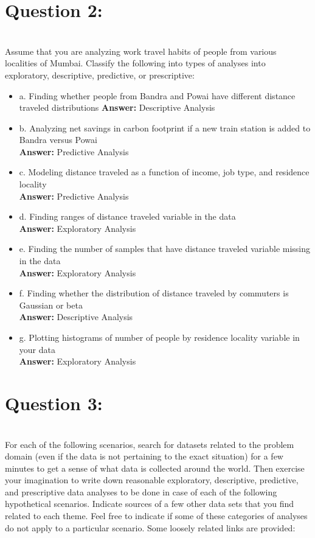 \documentclass[12pt]{article}
\begin{document}
\section*{Question 2:}\\
Assume that you are analyzing work travel habits of people from various localities of Mumbai. Classify the
following into types of analyses into exploratory, descriptive, predictive, or prescriptive: \\
\begin{itemize}
    \item a. Finding whether people from Bandra and Powai have different distance traveled distributions
    \textbf{Answer:} Descriptive Analysis
    \item b. Analyzing net savings in carbon footprint if a new train station is added to Bandra versus Powai\\
    \textbf{Answer:} Predictive Analysis
    \item c. Modeling distance traveled as a function of income, job type, and residence locality\\
    \textbf{Answer:} Predictive Analysis
    \item d. Finding ranges of distance traveled variable in the data\\ 
    \textbf{Answer:} Exploratory Analysis
    \item e. Finding the number of samples that have distance traveled variable missing in the data \\
    \textbf{Answer:} Exploratory Analysis
    \item f. Finding whether the distribution of distance traveled by commuters is Gaussian or beta \\
    \textbf{Answer:} Descriptive Analysis
    \item g. Plotting histograms of number of people by residence locality variable in your data \\
    \textbf{Answer:} Exploratory Analysis
\end{itemize}

\section*{Question 3:}\\
For each of the following scenarios, search for datasets related to the problem domain (even if the data is not pertaining to the exact situation) for a few minutes to get a sense of what data is collected around the world. Then exercise your imagination to write down reasonable exploratory, descriptive, predictive, and prescriptive data analyses to be done in case of each of the following hypothetical scenarios. Indicate sources of a few other data sets that you find related to each theme. Feel free to indicate if some of these categories of analyses do not apply to a particular scenario. Some loosely related links are provided: 
\end{document}
